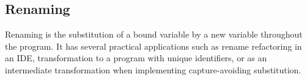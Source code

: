

\subsection{Renaming}


Renaming is the substitution of a bound variable by a new variable throughout the program.
It has several practical applications such as rename refactoring in an IDE, transformation to a program with unique identifiers,  or as an intermediate transformation when implementing  capture-avoiding substitution.


